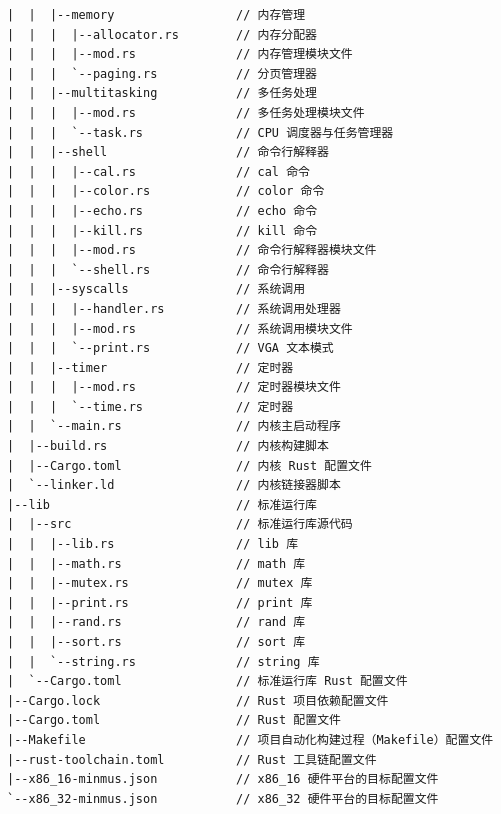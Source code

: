 \begin{verbatim}
|  |  |--memory                 // 内存管理
|  |  |  |--allocator.rs        // 内存分配器
|  |  |  |--mod.rs              // 内存管理模块文件
|  |  |  `--paging.rs           // 分页管理器
|  |  |--multitasking           // 多任务处理
|  |  |  |--mod.rs              // 多任务处理模块文件
|  |  |  `--task.rs             // CPU 调度器与任务管理器
|  |  |--shell                  // 命令行解释器
|  |  |  |--cal.rs              // cal 命令
|  |  |  |--color.rs            // color 命令
|  |  |  |--echo.rs             // echo 命令
|  |  |  |--kill.rs             // kill 命令
|  |  |  |--mod.rs              // 命令行解释器模块文件
|  |  |  `--shell.rs            // 命令行解释器
|  |  |--syscalls               // 系统调用
|  |  |  |--handler.rs          // 系统调用处理器
|  |  |  |--mod.rs              // 系统调用模块文件
|  |  |  `--print.rs            // VGA 文本模式
|  |  |--timer                  // 定时器
|  |  |  |--mod.rs              // 定时器模块文件
|  |  |  `--time.rs             // 定时器
|  |  `--main.rs                // 内核主启动程序
|  |--build.rs                  // 内核构建脚本
|  |--Cargo.toml                // 内核 Rust 配置文件
|  `--linker.ld                 // 内核链接器脚本
|--lib                          // 标准运行库
|  |--src                       // 标准运行库源代码
|  |  |--lib.rs                 // lib 库
|  |  |--math.rs                // math 库
|  |  |--mutex.rs               // mutex 库
|  |  |--print.rs               // print 库
|  |  |--rand.rs                // rand 库
|  |  |--sort.rs                // sort 库
|  |  `--string.rs              // string 库
|  `--Cargo.toml                // 标准运行库 Rust 配置文件
|--Cargo.lock                   // Rust 项目依赖配置文件
|--Cargo.toml                   // Rust 配置文件
|--Makefile                     // 项目自动化构建过程（Makefile）配置文件
|--rust-toolchain.toml          // Rust 工具链配置文件
|--x86_16-minmus.json           // x86_16 硬件平台的目标配置文件
`--x86_32-minmus.json           // x86_32 硬件平台的目标配置文件
\end{verbatim}